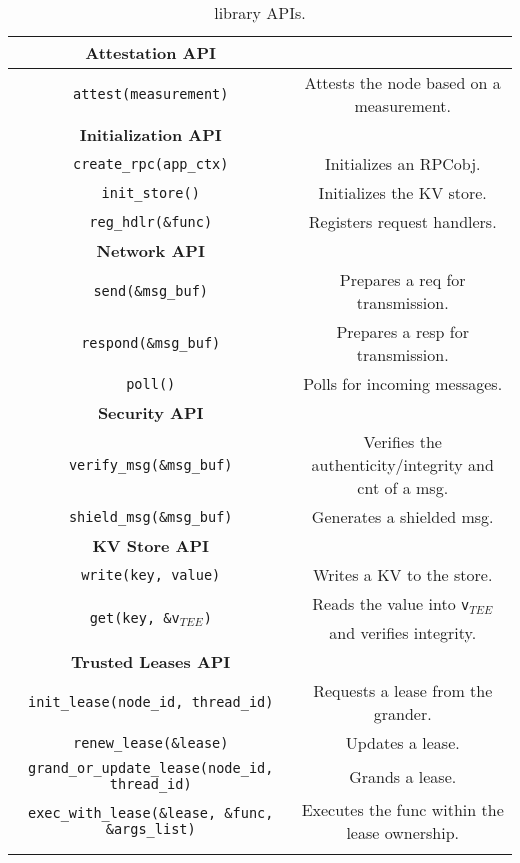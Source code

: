 \begin{table}[t]
\fontsize{7}{9}\selectfont 

\begin{center}
\begin{tabular}{ |c|c| }
 \hline
 \bf{Attestation API} &  \\ \hline
 \multirow{1}{*}{\texttt{attest(measurement)}} & Attests the node based on  a measurement.  \\  \hline \hline
 \bf{Initialization API} &  \\ \hline
 \texttt{create\_rpc(app\_ctx)} & Initializes an RPCobj. \\
  \texttt{init\_store()} & Initializes the KV store. \\
  \texttt{reg\_hdlr(\&func)} & Registers request handlers. \\ \hline \hline
 \bf{Network API} &  \\ \hline
 \texttt{send(\&msg\_buf)} & Prepares a req for transmission. \\
 \multirow{1}{*}{\texttt{respond(\&msg\_buf)}} & Prepares a resp for transmission. \\
 \texttt{poll()} & Polls for incoming messages. \\\hline \hline
 \bf{Security API} &  \\ \hline
 \texttt{verify\_msg(\&msg\_buf)} & Verifies the authenticity/integrity and cnt of a msg. \\
 \texttt{shield\_msg(\&msg\_buf)} & Generates a shielded msg. \\ \hline \hline
 \bf{KV Store API} &  \\ \hline
 \texttt{write(key, value)} & Writes a KV to the store. \\
 \hline
 \multirow{2}{*}{\texttt{get(key, \&v$_{TEE}$)}} & Reads the value into \texttt{v$_{TEE}$} \\ & and verifies integrity. \\ \hline %
 \if 0
 \bf{Trusted Leases API} &  \\ \hline
 \texttt{init\_lease(node\_id, thread\_id)} & Requests a lease from the grander.\\ \hline
 \texttt{renew\_lease(\&lease)} & Updates a lease.\\ \hline
 \texttt{grand\_or\_update\_lease(node\_id, thread\_id)} & Grands a lease.\\ \hline
 \texttt{exec\_with\_lease(\&lease, \&func, \&args\_list)} & Executes the func within the lease ownership.\\ [1ex] \hline
 \fi
\end{tabular}
\end{center}
\caption{\projecttitle{} library APIs.} \label{tab:api}
\vspace{-6pt}
\end{table}





